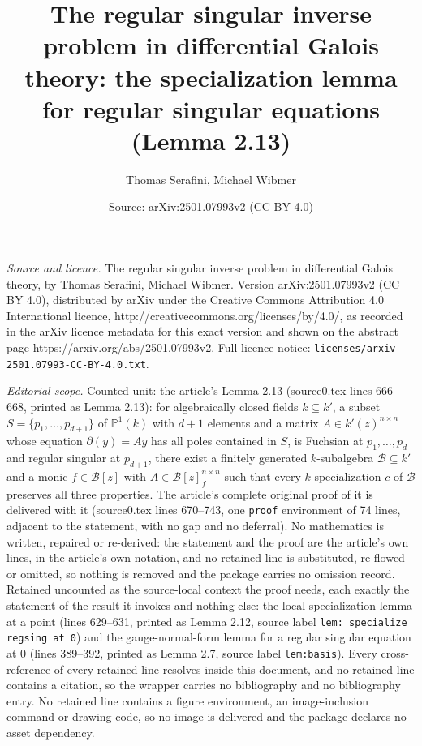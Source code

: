 \documentclass[10pt,a4paper]{amsart}
\title[Lemma 2.13]{The regular singular inverse problem in differential Galois theory: the specialization lemma for regular singular equations (Lemma 2.13)}
\author{Thomas Serafini, Michael Wibmer}
\date{Source: arXiv:2501.07993v2 (CC BY 4.0)}
\def\P{\mathbb P}
\def\l{\mathcal}
\def\del{\partial}
\begin{document}
\maketitle

\noindent\emph{Source and licence.} The regular singular inverse problem in differential Galois theory, by Thomas Serafini, Michael Wibmer. Version arXiv:2501.07993v2
(CC BY 4.0), distributed by arXiv under the Creative Commons Attribution 4.0 International licence,
http://creativecommons.org/licenses/by/4.0/, as recorded in the arXiv licence metadata for this exact
version and shown on the abstract page https://arxiv.org/abs/2501.07993v2. Full licence notice:
\texttt{licenses/arxiv-2501.07993-CC-BY-4.0.txt}.\par\smallskip

\noindent\textit{Editorial scope.} Counted unit: the article's Lemma 2.13 (source0.tex lines 666--668, printed as Lemma 2.13): for algebraically closed fields $k\subseteq k'$, a subset $S=\{p_1,\ldots,p_{d+1}\}$ of $\P^1(k)$ with $d+1$ elements and a matrix $A\in k'(z)^{n\times n}$ whose equation $\del(y)=Ay$ has all poles contained in $S$, is Fuchsian at $p_1,\ldots,p_d$ and regular singular at $p_{d+1}$, there exist a finitely generated $k$-subalgebra $\l B\subseteq k'$ and a monic $f\in\l B[z]$ with $A\in\l B[z]_f^{n\times n}$ such that every $k$-specialization $c$ of $\l B$ preserves all three properties. The article's complete original proof of it is delivered with it (source0.tex lines 670--743, one \texttt{proof} environment of 74 lines, adjacent to the statement, with no gap and no deferral). No mathematics is written, repaired or re-derived: the statement and the proof are the article's own lines, in the article's own notation, and no retained line is substituted, re-flowed or omitted, so nothing is removed and the package carries no omission record. Retained uncounted as the source-local context the proof needs, each exactly the statement of the result it invokes and nothing else: the local specialization lemma at a point (lines 629--631, printed as Lemma 2.12, source label \texttt{lem: specialize regsing at 0}) and the gauge-normal-form lemma for a regular singular equation at $0$ (lines 389--392, printed as Lemma 2.7, source label \texttt{lem:basis}). Every cross-reference of every retained line resolves inside this document, and no retained line contains a citation, so the wrapper carries no bibliography and no bibliography entry. No retained line contains a figure environment, an image-inclusion command or drawing code, so no image is delivered and the package declares no asset dependency.
\end{document}
